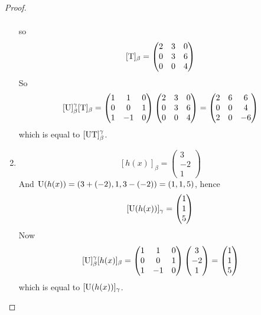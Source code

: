 \begin{proof}
\begin{enumerate}
\begin{align*}
\end{align*}
so
\[
    [\mathrm{T}]_{\beta} = \begin{pmatrix} 2 & 3 & 0 \\ 0 & 3 & 6 \\ 0 & 0 & 4 \end{pmatrix}
\]
So
\[
    [\mathrm{U}]_{\beta}^{\gamma} [\mathrm{T}]_{\beta}
    = \begin{pmatrix} 1 & 1 & 0 \\ 0 & 0 & 1 \\ 1 & -1 & 0 \end{pmatrix}
      \begin{pmatrix} 2 & 3 & 0 \\ 0 & 3 & 6 \\ 0 & 0 & 4 \end{pmatrix}
    = \begin{pmatrix} 2 & 6 & 6 \\ 0 & 0 & 4 \\ 2 & 0 & -6 \end{pmatrix}
\]
which is equal to \([\mathrm{U}\mathrm{T}]_{\beta}^{\gamma}\).

\item
\[
    [h(x)]_{\beta} = \begin{pmatrix} 3 \\ -2 \\ 1 \end{pmatrix}
\]
And \(\mathrm{U}(h(x)) = (3 + (-2), 1, 3 - (-2)) = (1, 1, 5)\), hence
\[
    [\mathrm{U}(h(x))]_{\gamma} = \begin{pmatrix} 1 \\ 1 \\ 5 \end{pmatrix}
\]
Now
\[
    [\mathrm{U}]_{\beta}^{\gamma} [h(x)]_{\beta} =
    \begin{pmatrix} 1 & 1 & 0 \\ 0 & 0 & 1 \\ 1 & -1 & 0 \end{pmatrix} \begin{pmatrix} 3 \\ -2 \\ 1 \end{pmatrix}
    = \begin{pmatrix} 1 \\ 1 \\ 5 \end{pmatrix}
\]
which is equal to \([\mathrm{U}(h(x))]_{\gamma}\).
\end{enumerate}
\end{proof}

